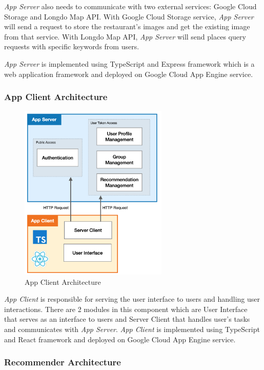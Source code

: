 \documentclass[12pt,oneside,openright,a4paper]{cpe-english-project}
\begin{document}
\textit{App Server} also needs to communicate with two external services: Google Cloud Storage and Longdo Map API. With Google Cloud Storage service, \textit{App Server} will send a request to store the restaurant’s images and get the existing image from that service. With Longdo Map API, \textit{App Server} will send places query requests with specific keywords from users. 

\textit{App Server} is implemented using TypeScript and Express framework which is a web application framework and deployed on Google Cloud App Engine service.


\subsubsection{App Client Architecture}

\begin{figure}[H]\centering
\includegraphics[width=200pt]{./images/3arch_appclient.png}
\caption{App Client Architecture}\label{fig:3arch_appclient}
\end{figure}\vspace{-24pt}

\textit{App Client} is responsible for serving the user interface to users and handling user interactions. There are 2 modules in this component which are User Interface that serves as an interface to users and Server Client that handles user’s tasks and communicates with \textit{App Server}. \textit{App Client} is implemented using TypeScript and React framework and deployed on Google Cloud App Engine service.


\subsubsection{Recommender Architecture}
\end{document}
